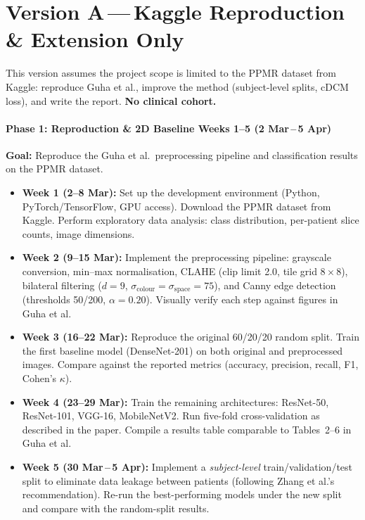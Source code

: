\documentclass[a4paper,11pt]{article}
\begin{document}
%
%

\newpage
\part*{Version A\,---\,Kaggle Reproduction \& Extension Only}

This version assumes the project scope is limited to the PPMR dataset from Kaggle: reproduce Guha et al., improve the method (subject-level splits, cDCM loss), and write the report. \textbf{No clinical cohort.}

\subsection*{\textcolor{phase1}{Phase 1: Reproduction \& 2D Baseline \hfill Weeks 1--5 {\normalfont(2 Mar\,--\,5 Apr)}}}

\textbf{Goal:} Reproduce the Guha et al.\ preprocessing pipeline and classification results on the PPMR dataset.

\begin{itemize}[leftmargin=*]
    \item \textbf{Week 1 (2--8 Mar):}
    Set up the development environment (Python, PyTorch/TensorFlow, GPU access).
    Download the PPMR dataset from Kaggle.
    Perform exploratory data analysis: class distribution, per-patient slice counts, image dimensions.

    \item \textbf{Week 2 (9--15 Mar):}
    Implement the preprocessing pipeline: grayscale conversion, min--max normalisation, CLAHE (clip limit 2.0, tile grid $8\times8$), bilateral filtering ($d{=}9$, $\sigma_{\text{colour}}{=}\sigma_{\text{space}}{=}75$), and Canny edge detection (thresholds 50/200, $\alpha{=}0.20$).
    Visually verify each step against figures in Guha et al.

    \item \textbf{Week 3 (16--22 Mar):}
    Reproduce the original 60/20/20 random split.
    Train the first baseline model (DenseNet-201) on both original and preprocessed images.
    Compare against the reported metrics (accuracy, precision, recall, F1, Cohen's $\kappa$).

    \item \textbf{Week 4 (23--29 Mar):}
    Train the remaining architectures: ResNet-50, ResNet-101, VGG-16, MobileNetV2.
    Run five-fold cross-validation as described in the paper.
    Compile a results table comparable to Tables~2--6 in Guha et al.

    \item \textbf{Week 5 (30 Mar\,--\,5 Apr):}
    Implement a \emph{subject-level} train/validation/test split to eliminate data leakage between patients (following Zhang et al.'s recommendation).
    Re-run the best-performing models under the new split and compare with the random-split results.
\end{itemize}
\end{document}

